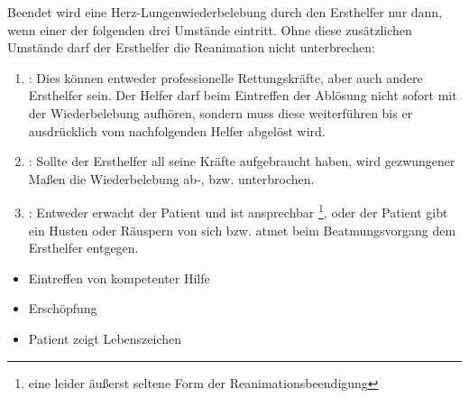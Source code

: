{
Beendet wird eine Herz-Lungenwiederbelebung durch den Ersthelfer nur
dann, wenn einer der folgenden drei Umstände eintritt. Ohne diese
zusätzlichen Umstände darf der Ersthelfer die Reanimation nicht
unterbrechen: 

\begin{enumerate}
  \item {}: 
  Dies können entweder professionelle Rettungskräfte, aber auch 
  andere Ersthelfer sein. 
  Der
  Helfer darf beim Eintreffen der Ablösung
  nicht sofort mit der Wiederbelebung  aufhören, sondern
  muss diese weiterführen bis er ausdrücklich vom
  nachfolgenden Helfer abgelöst wird.
  \item {}: Sollte der Ersthelfer all seine
  Kräfte aufgebraucht haben, wird gezwungener Maßen die
  Wiederbelebung ab-, bzw. unterbrochen.
  \item {}: Entweder
  erwacht der Patient und ist ansprechbar \footnote{eine
  leider äußerst seltene Form der Reanimationsbeendigung},
  oder der Patient gibt ein Husten oder Räuspern von sich
  bzw. atmet beim Beatmungsvorgang dem Ersthelfer entgegen.
\end{enumerate}

}{
\begin{itemize}
  \item Eintreffen von kompetenter Hilfe
  \item Erschöpfung
  \item Patient zeigt Lebenszeichen
\end{itemize}
}{}{}{}

\begin{Danger}
\end{Danger}

